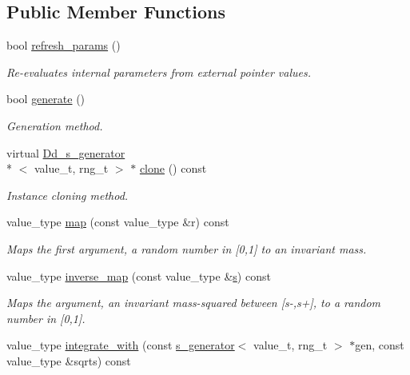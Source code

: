 \subsection*{Public Member Functions}
\begin{DoxyCompactItemize}
\item 
bool \hyperlink{a00125_a4b285bf09304c6ebced13163204e2991}{refresh\-\_\-params} ()
\begin{DoxyCompactList}\small\item\em Re-\/evaluates internal parameters from external pointer values. \end{DoxyCompactList}\item 
\hypertarget{a00125_ac4a36fc9909021421683895df20ede8b}{bool \hyperlink{a00125_ac4a36fc9909021421683895df20ede8b}{generate} ()}\label{a00125_ac4a36fc9909021421683895df20ede8b}

\begin{DoxyCompactList}\small\item\em Generation method. \end{DoxyCompactList}\item 
virtual \hyperlink{a00125}{Dd\-\_\-s\-\_\-generator}\\*
$<$ value\-\_\-t, rng\-\_\-t $>$ $\ast$ \hyperlink{a00125_a3c156dac512e2295e26419c56895e7de}{clone} () const 
\begin{DoxyCompactList}\small\item\em Instance cloning method. \end{DoxyCompactList}\item 
value\-\_\-type \hyperlink{a00125_a2dfe67d9dc674f7b1e8bd48e1c570940}{map} (const value\-\_\-type \&r) const 
\begin{DoxyCompactList}\small\item\em Maps the first argument, a random number in \mbox{[}0,1\mbox{]} to an invariant mass. \end{DoxyCompactList}\item 
value\-\_\-type \hyperlink{a00125_ab4beb985bdd0e09b93365f7200aece74}{inverse\-\_\-map} (const value\-\_\-type \&\hyperlink{a00482_a8bf50336c0da12a27a71eb1154a7012e}{s}) const 
\begin{DoxyCompactList}\small\item\em Maps the argument, an invariant mass-\/squared between \mbox{[}s-\/,s+\mbox{]}, to a random number in \mbox{[}0,1\mbox{]}. \end{DoxyCompactList}\item 
\hypertarget{a00125_aa52c9f803cd5261f2ac5709feed38430}{value\-\_\-type \hyperlink{a00125_aa52c9f803cd5261f2ac5709feed38430}{integrate\-\_\-with} (const \hyperlink{a00482}{s\-\_\-generator}$<$ value\-\_\-t, rng\-\_\-t $>$ $\ast$gen, const value\-\_\-type \&sqrts) const }\label{a00125_aa52c9f803cd5261f2ac5709feed38430}


\end{DoxyCompactItemize}
